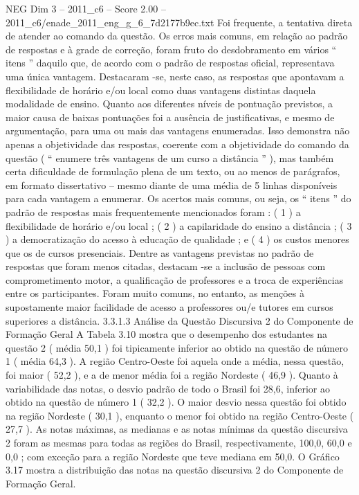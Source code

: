 \begin{textsample}{NEG Dim 3 – 2011\_c6 – Score 2.00 – 2011\_c6/enade\_2011\_eng\_g\_6\_7d2177b9ec.txt}
Foi frequente, a tentativa direta de atender ao comando da questão.
Os erros mais comuns, em relação ao padrão de respostas e à grade de correção, foram fruto do desdobramento em vários “ itens ” daquilo que, de acordo com o padrão de respostas oficial, representava uma única vantagem.
Destacaram -se, neste caso, as respostas que apontavam a flexibilidade de horário e/ou local como duas vantagens distintas daquela modalidade de ensino.
Quanto aos diferentes níveis de pontuação previstos, a maior causa de baixas pontuações foi a ausência de justificativas, e mesmo de argumentação, para uma ou mais das vantagens enumeradas.
Isso demonstra não apenas a objetividade das respostas, coerente com a objetividade do comando da questão ( “ enumere três vantagens de um curso a distância ” ), mas também certa dificuldade de formulação plena de um texto, ou ao menos de parágrafos, em formato dissertativo – mesmo diante de uma média de 5 linhas disponíveis para cada vantagem a enumerar.
Os acertos mais comuns, ou seja, os “ itens ” do padrão de respostas mais frequentemente mencionados foram : ( 1 ) a flexibilidade de horário e/ou local ; ( 2 ) a capilaridade do ensino a distância ; ( 3 ) a democratização do acesso à educação de qualidade ; e ( 4 ) os custos menores que os de cursos presenciais.
Dentre as vantagens previstas no padrão de respostas que foram menos citadas, destacam -se a inclusão de pessoas com comprometimento motor, a qualificação de professores e a troca de experiências entre os participantes.
Foram muito comuns, no entanto, as menções à supostamente maior facilidade de acesso a professores ou/e tutores em cursos superiores a distância. 3.3.1.3 Análise da Questão Discursiva 2 do Componente de Formação Geral A Tabela 3.10 mostra que o desempenho dos estudantes na questão 2 ( média 50,1 ) foi tipicamente inferior ao obtido na questão de número 1 ( média 64,3 ).
A região Centro-Oeste foi aquela onde a média, nessa questão, foi maior ( 52,2 ), e a de menor média foi a região Nordeste ( 46,9 ).
Quanto à variabilidade das notas, o desvio padrão de todo o Brasil foi 28,6, inferior ao obtido na questão de número 1 ( 32,2 ).
O maior desvio nessa questão foi obtido na região Nordeste ( 30,1 ), enquanto o menor foi obtido na região Centro-Oeste ( 27,7 ).
As notas máximas, as medianas e as notas mínimas da questão discursiva 2 foram as mesmas para todas as regiões do Brasil, respectivamente, 100,0, 60,0 e 0,0 ; com exceção para a região Nordeste que teve mediana em 50,0.
O Gráfico 3.17 mostra a distribuição das notas na questão discursiva 2 do Componente de Formação Geral.

\end{textsample}
